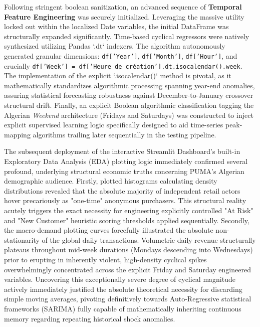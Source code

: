 \documentclass[12pt,a4paper]{report}
\begin{document}
Following stringent boolean sanitization, an advanced sequence of \textbf{Temporal Feature Engineering} was securely initialized. Leveraging the massive utility locked out within the localized Date variables, the initial DataFrame was structurally expanded significantly. Time-based cyclical regressors were natively synthesized utilizing Pandas `.dt` indexers. The algorithm autonomously generated granular dimensions: \texttt{df['Year']}, \texttt{df['Month']}, \texttt{df['Hour']}, and crucially \texttt{df['Week'] = df['Heure de création'].dt.isocalendar().week}. The implementation of the explicit `.isocalendar()` method is pivotal, as it mathematically standardizes algorithmic processing spanning year-end anomalies, assuring statistical forecasting robustness against December-to-January crossover structural drift. Finally, an explicit Boolean algorithmic classification tagging the Algerian \textit{Weekend} architecture (Fridays and Saturdays) was constructed to inject explicit supervised learning logic specifically designed to aid time-series peak-mapping algorithms trailing later sequentially in the testing pipeline.

The subsequent deployment of the interactive Streamlit Dashboard's built-in Exploratory Data Analysis (EDA) plotting logic immediately confirmed several profound, underlying structural economic truths concerning PUMA's Algerian demographic audience. Firstly, plotted histograms calculating density distributions revealed that the absolute majority of independent retail actors hover precariously as "one-time" anonymous purchasers. This structural reality acutely triggers the exact necessity for engineering explicitly controlled "At Risk" and "New Customer" heuristic scoring thresholds applied sequentially. Secondly, the macro-demand plotting curves forcefully illustrated the absolute non-stationarity of the global daily transactions. Volumetric daily revenue structurally plateaus throughout mid-week durations (Mondays descending into Wednesdays) prior to erupting in inherently violent, high-density cyclical spikes overwhelmingly concentrated across the explicit Friday and Saturday engineered variables. Uncovering this exceptionally severe degree of cyclical magnitude actively immediately justified the absolute theoretical necessity for discarding simple moving averages, pivoting definitively towards Auto-Regressive statistical frameworks (SARIMA) fully capable of mathematically inheriting continuous memory regarding repeating historical shock anomalies.

\end{document}

